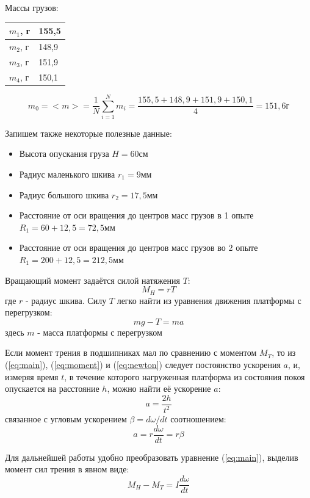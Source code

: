 \documentclass[a4paper, 12pt]{article}
\begin{document}
Массы грузов:
\begin{center}
\begin{tabular}{|l|l|}
\hline
$m_1$, г & 155,5 \\ \hline
$m_2$, г & 148,9 \\ \hline
$m_3$, г & 151,9 \\ \hline
$m_4$, г & 150,1 \\ \hline
\end{tabular}
\end{center}

\[
m_0 = <m> = \frac{1}{N}\sum_{i=1}^N m_i = \frac{155,5+148,9+151,9+150,1}{4} = 151,6\text{г} 
\]

Запишем также некоторые полезные данные:
\begin{itemize}
	\item Высота опускания груза $H = 60$см
	\item Радиус маленького шкива $r_1 = 9$мм
	\item Радиус большого шкива $r_2 = 17,5$мм
	\item Расстояние от оси вращения до центров масс грузов в 1 опыте $R_1 = 60 + 12,5 = 72,5$мм
	\item Расстояние от оси вращения до центров масс грузов во 2 опыте $R_1 = 200 + 12,5 = 212,5$мм
\end{itemize}

Вращающий момент задаётся силой натяжения $T$:
\begin{equation} \label{eq:moment}
M_H = rT
\end{equation}
где $r$ - радиус шкива. Силу $T$ легко найти из уравнения движения платформы с перегрузком:
\begin{equation} \label{eq:newton}
mg - T = ma
\end{equation}
здесь $m$ - масса платформы с перегрузком

Если момент трения в подшипниках мал по сравнению с моментом $M_T$, то из (\ref{eq:main}), (\ref{eq:moment}) и (\ref{eq:newton}) следует постоянство ускорения $a$, и, измеряя время $t$, в течение которого нагруженная платформа из состояния покоя опускается на расстояние $h$,
можно найти её ускорение $a$:
\[
a = \frac{2h}{t^2}
\]
связанное с угловым ускорением $\beta = d\omega /dt$ соотношением:
\begin{equation} \label{eq:acel}
a = r\frac{d\omega}{dt} = r\beta
\end{equation}

Для дальнейшей работы удобно преобразовать уравнение (\ref{eq:main}), выделив момент сил трения в явном виде:
\[
M_H - M_T = I\frac{d\omega}{dt}
\]
\end{document}
